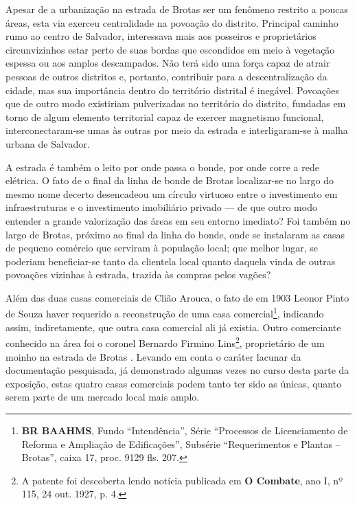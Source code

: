
Apesar de a urbanização na estrada de Brotas ser um fenômeno restrito a poucas áreas, esta via exerceu centralidade na povoação do distrito. Principal caminho rumo ao centro de Salvador, interessava mais aos posseiros e proprietários circunvizinhos estar perto de suas bordas que escondidos em meio à vegetação espessa ou aos amplos descampados. Não terá sido uma força capaz de atrair pessoas de outros distritos e, portanto, contribuir para a descentralização da cidade, mas sua importância dentro do território distrital é inegável. Povoações que de outro modo existiriam pulverizadas no território do distrito, fundadas em torno de algum elemento territorial capaz de exercer magnetismo funcional, interconectaram-se umas às outras por meio da estrada e interligaram-se à malha urbana de Salvador.

A estrada é também o leito por onde passa o bonde, por onde corre a rede elétrica. O fato de o final da linha de bonde de Brotas localizar-se no largo do mesmo nome decerto desencadeou um círculo virtuoso entre o investimento em infraestruturas e o investimento imobiliário privado --- de que outro modo entender a grande valorização das áreas em seu entorno imediato? Foi também no largo de Brotas, próximo ao final da linha do bonde, onde se instalaram as casas de pequeno comércio que serviram à população local; que melhor lugar, se poderiam beneficiar-se tanto da clientela local quanto daquela vinda de outras povoações vizinhas à estrada, trazida às compras pelos vagões?


Além das duas casas comerciais de Clião Arouca, o fato de em 1903 Leonor Pinto de Souza haver requerido a reconstrução de uma casa comercial\footnote{\textbf{BR BAAHMS}, Fundo ``Intendência'', Série ``Processos de Licenciamento de Reforma e Ampliação de Edificações'', Subsérie ``Requerimentos e Plantas -- Brotas'', caixa 17, proc. 9129 fls. 207.}, indicando assim, indiretamente, que outra casa comercial ali já existia. Outro comerciante conhecido na área foi o coronel Bernardo Firmino Lins\footnote{A patente foi descoberta lendo notícia publicada em \textbf{O Combate}, ano I, nº 115, 24 out. 1927, p. 4.}, proprietário de um moinho na estrada de Brotas \cite[p.~433]{reis_almanak_1898}. Levando em conta o caráter lacunar da documentação pesquisada, já demonstrado algumas vezes no curso desta parte da exposição, estas quatro casas comerciais podem tanto ter sido as únicas, quanto serem parte de um mercado local mais amplo.

